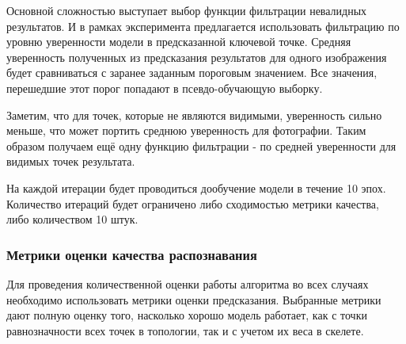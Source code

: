 Основной сложностью выступает выбор функции фильтрации невалидных результатов. И в рамках эксперимента предлагается использовать фильтрацию по уровню уверенности модели в предсказанной ключевой точке. Средняя уверенность полученных из предсказания результатов для одного изображения будет сравниваться с заранее заданным пороговым значением. Все значения, перешедшие этот порог попадают в псевдо-обучающую выборку.

Заметим, что для точек, которые не являются видимыми, уверенность сильно меньше, что может портить среднюю уверенность для фотографии. Таким образом получаем ещё одну функцию фильтрации - по средней уверенности для видимых точек результата.

На каждой итерации будет проводиться дообучение модели в течение 10 эпох. Количество итераций будет ограничено либо сходимостью метрики качества, либо количеством 10 штук.

\subsubsection*{Метрики оценки качества распознавания}

Для проведения количественной оценки работы алгоритма во всех случаях необходимо использовать метрики оценки предсказания. Выбранные метрики дают полную оценку того, насколько хорошо модель работает, как с точки равнозначности всех точек в топологии, так и с учетом их веса в скелете.

